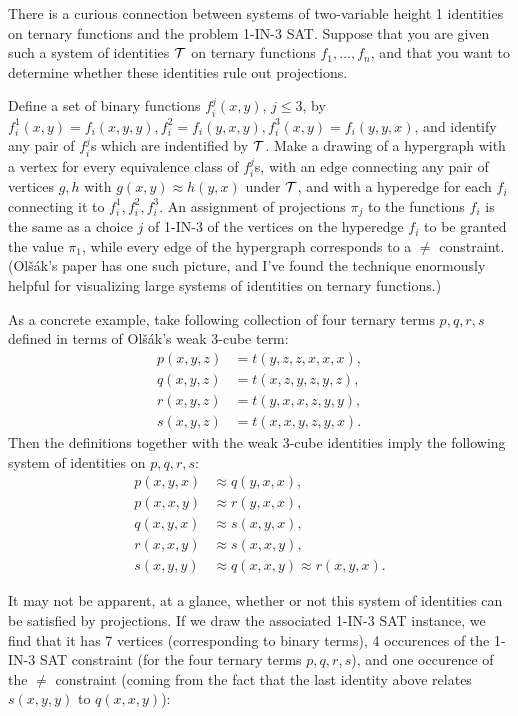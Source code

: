 \documentclass[letterpaper,11pt]{article}
\begin{document}
\begin{rem} There is a curious connection between systems of two-variable height 1 identities on ternary functions and the problem 1-IN-3 SAT. Suppose that you are given such a system of identities $\mathcal{T}$ on ternary functions $f_1, ..., f_n$, and that you want to determine whether these identities rule out projections.

Define a set of binary functions $f_i^j(x,y)$, $j \le 3$, by $f_i^1(x,y) = f_i(x,y,y), f_i^2 = f_i(y,x,y), f_i^3(x,y) = f_i(y,y,x)$, and identify any pair of $f_i^j$s which are indentified by $\mathcal{T}$. Make a drawing of a hypergraph with a vertex for every equivalence class of $f_i^j$s, with an edge connecting any pair of vertices $g,h$ with $g(x,y) \approx h(y,x)$ under $\mathcal{T}$, and with a hyperedge for each $f_i$ connecting it to $f_i^1, f_i^2, f_i^3$. An assignment of projections $\pi_j$ to the functions $f_i$ is the same as a choice $j$ of 1-IN-3 of the vertices on the hyperedge $f_i$ to be granted the value $\pi_1$, while every edge of the hypergraph corresponds to a $\ne$ constraint. (Ol{\v{s}}{\'a}k's paper \cite{olsak-weak} has one such picture, and I've found the technique enormously helpful for visualizing large systems of identities on ternary functions.)

As a concrete example, take following collection of four ternary terms $p,q,r,s$ defined in terms of Ol\v{s}\'ak's weak 3-cube term:
\begin{align*}
p(x,y,z) &= t(y,z,z,x,x,x),\\
q(x,y,z) &= t(x,z,y,z,y,z),\\
r(x,y,z) &= t(y,x,x,z,y,y),\\
s(x,y,z) &= t(x,x,y,z,y,x).
\end{align*}
Then the definitions together with the weak 3-cube identities imply the following system of identities on $p,q,r,s$:
\begin{align*}
p(x,y,x) &\approx q(y,x,x),\\
p(x,x,y) &\approx r(y,x,x),\\
q(x,y,x) &\approx s(x,y,x),\\
r(x,x,y) &\approx s(x,x,y),\\
s(x,y,y) &\approx q(x,x,y) \approx r(x,y,x). 
\end{align*}

It may not be apparent, at a glance, whether or not this system of identities can be satisfied by projections. If we draw the associated 1-IN-3 SAT instance, we find that it has 7 vertices (corresponding to binary terms), 4 occurences of the 1-IN-3 SAT constraint (for the four ternary terms $p,q,r,s$), and one occurence of the $\ne$ constraint (coming from the fact that the last identity above relates $s(x,y,y)$ to $q(x,x,y)$):
\begin{center}
\end{center}
\end{rem}
\end{document}
